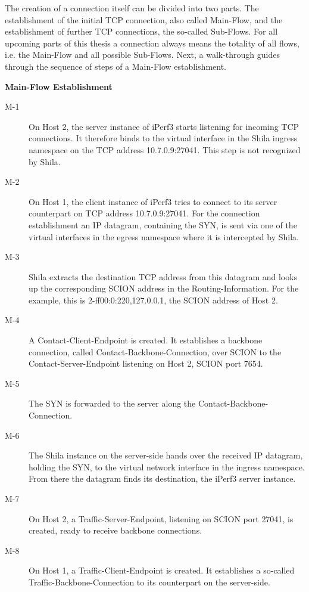 The creation of a connection itself can be divided into two parts. The establishment of the initial TCP connection, also called Main-Flow, and the establishment of further TCP connections, the so-called Sub-Flows. For all upcoming parts of this thesis a connection always means the totality of all flows, i.e. the Main-Flow and all possible Sub-Flows. Next, a walk-through guides through the sequence of steps of a Main-Flow establishment.

\textbf{Main-Flow Establishment}

\begin{description}
	\item[M-1] On Host 2, the server instance of iPerf3 starts listening for incoming TCP connections. It therefore binds to the virtual interface in the Shila ingress namespace on the TCP address {\footnotesize 10.7.0.9:27041}. This step is not recognized by Shila.
	\item[M-2] On Host 1, the client instance of iPerf3 tries to connect to its server counterpart on TCP address {\footnotesize 10.7.0.9:27041}. For the connection establishment an IP datagram, containing the SYN, is sent via one of the virtual interfaces in the egress namespace where it is intercepted by Shila.
	\item[M-3] Shila extracts the destination TCP address from this datagram and looks up the corresponding SCION address in the Routing-Information. For the example, this is {\footnotesize 2-ff00:0:220,127.0.0.1}, the SCION address of Host 2. 
	\item[M-4] A Contact-Client-Endpoint is created. It establishes a backbone connection, called Contact-Backbone-Connection, over SCION to the Contact-Server-Endpoint listening on Host 2, SCION port {\footnotesize 7654}.
	\item[M-5] The SYN is forwarded to the server along the Contact-Backbone-Connection.
	\item[M-6] The Shila instance on the server-side hands over the received IP datagram, holding the SYN, to the virtual network interface in the ingress namespace. From there the datagram finds its destination, the iPerf3 server instance.
	\item[M-7] On Host 2, a Traffic-Server-Endpoint, listening on SCION port {\footnotesize 27041}, is created, ready to receive backbone connections.
	\item[M-8] On Host 1, a Traffic-Client-Endpoint is created. It establishes a so-called Traffic-Backbone-Connection to its counterpart on the server-side.

\end{description}
